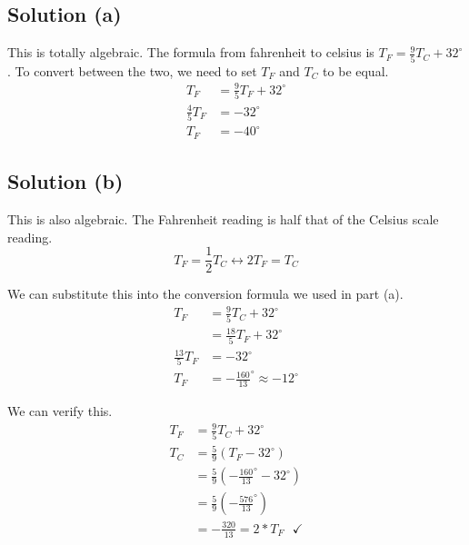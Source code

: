 \documentclass[12pt]{article}
\begin{document}
        \subsection{Solution (a)}
            This is totally algebraic. 
            The formula from fahrenheit to celsius is $T_F = \frac{9}{5}T_C + 32^{\circ}$.
            To convert between the two, we need to set $T_F$ and $T_C$ to be equal.
            \begin{align}
                T_F &=  \frac{9}{5}T_F + 32^\circ\\
                \frac{4}{5}T_F  &=  -32^\circ\\
                T_F &=  \boxed{-40^\circ}
            \end{align}

        \subsection{Solution (b)}
            This is also algebraic.
            The Fahrenheit reading is half that of the Celsius scale reading.
            \begin{equation}
                T_F = \frac{1}{2}T_C \leftrightarrow 2 T_F = T_C
            \end{equation}

            We can substitute this into the conversion formula we used in part (a).
            \begin{align}
                T_F &=  \frac{9}{5}T_C + 32^\circ\\
                    &=  \frac{18}{5}T_F + 32^\circ\\
                \frac{13}{5}T_F &=  -32^\circ\\
                T_F &=  \boxed{-\frac{160}{13}^\circ \approx -12^\circ}
            \end{align}

            We can verify this.
            \begin{align}
                T_F &=  \frac{9}{5}T_C + 32^\circ\\
                T_C &=  \frac{5}{9}\left(T_F - 32^\circ\right)\\
                    &=  \frac{5}{9}\left(-\frac{160}{13}^\circ - 32^\circ\right)\\
                    &=  \frac{5}{9}\left(-\frac{576}{13}^\circ\right)\\
                    &=  -\frac{320}{13} = 2 * T_F\ \ \ \checkmark
            \end{align}
\end{document}
